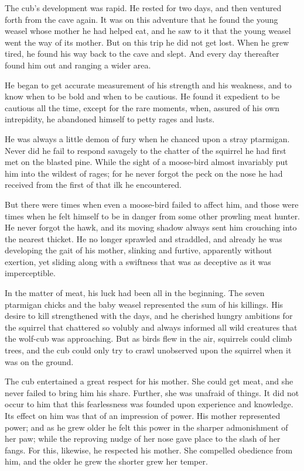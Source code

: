 \documentclass[10pt]{book}
\begin{document}
The cub’s development was rapid. He rested for two days, and then
ventured forth from the cave again. It was on this adventure that he
found the young weasel whose mother he had helped eat, and he saw to it
that the young weasel went the way of its mother. But on this trip he
did not get lost. When he grew tired, he found his way back to the cave
and slept. And every day thereafter found him out and ranging a wider
area.

He began to get accurate measurement of his strength and his weakness,
and to know when to be bold and when to be cautious. He found it
expedient to be cautious all the time, except for the rare moments,
when, assured of his own intrepidity, he abandoned himself to petty
rages and lusts.

He was always a little demon of fury when he chanced upon a stray
ptarmigan. Never did he fail to respond savagely to the chatter of the
squirrel he had first met on the blasted pine. While the sight of a
moose-bird almost invariably put him into the wildest of rages; for he
never forgot the peck on the nose he had received from the first of
that ilk he encountered.

But there were times when even a moose-bird failed to affect him, and
those were times when he felt himself to be in danger from some other
prowling meat hunter. He never forgot the hawk, and its moving shadow
always sent him crouching into the nearest thicket. He no longer
sprawled and straddled, and already he was developing the gait of his
mother, slinking and furtive, apparently without exertion, yet sliding
along with a swiftness that was as deceptive as it was imperceptible.

In the matter of meat, his luck had been all in the beginning. The
seven ptarmigan chicks and the baby weasel represented the sum of his
killings. His desire to kill strengthened with the days, and he
cherished hungry ambitions for the squirrel that chattered so volubly
and always informed all wild creatures that the wolf-cub was
approaching. But as birds flew in the air, squirrels could climb trees,
and the cub could only try to crawl unobserved upon the squirrel when
it was on the ground.

The cub entertained a great respect for his mother. She could get meat,
and she never failed to bring him his share. Further, she was unafraid
of things. It did not occur to him that this fearlessness was founded
upon experience and knowledge. Its effect on him was that of an
impression of power. His mother represented power; and as he grew older
he felt this power in the sharper admonishment of her paw; while the
reproving nudge of her nose gave place to the slash of her fangs. For
this, likewise, he respected his mother. She compelled obedience from
him, and the older he grew the shorter grew her temper.
\end{document}

